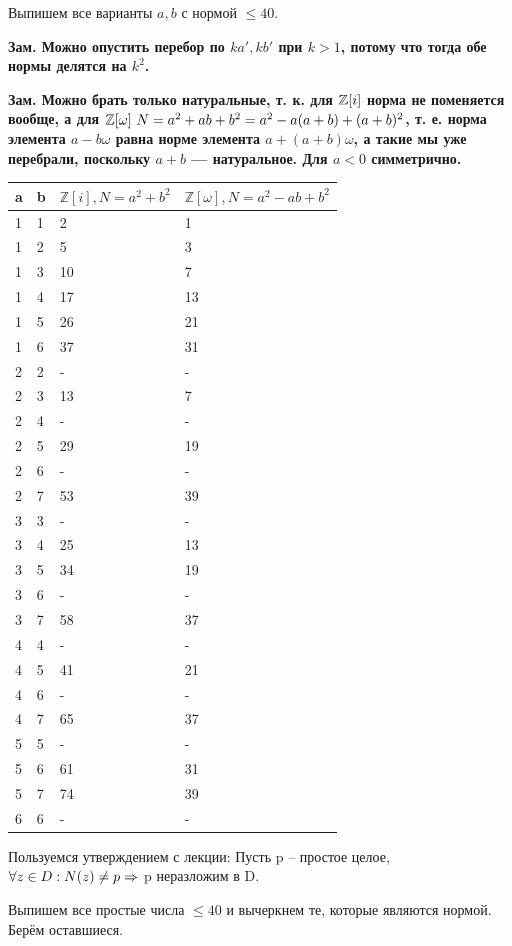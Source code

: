 \begin{solution}

Выпишем все варианты \(a, b\) с нормой \(\le 40\).

\bf{Зам.} Можно опустить перебор по \(ka', kb'\) при \(k > 1\), потому что тогда обе нормы делятся на \(k^2\).

\bf{Зам.} Можно брать только натуральные, т. к. для $\mathbb{Z}[i]$ норма не поменяется вообще, а для $\mathbb{Z}[\omega] \ N =  a^2 + ab + b^2 = a^2 - a (a+b) + (a+b)^2$, т. е. норма элемента $a - b \omega$ равна норме элемента $a + (a+b) \omega$, а такие мы уже перебрали, поскольку $a+b$ --- натуральное. Для $a <0$ симметрично.

\begin{longtable}[]{@{}llll@{}}
\toprule
a & b & \(\mathbb{Z}[i], N = a^2+b^2\) & \(\mathbb{Z}[\omega], N = a^2-ab+b^2\)\tabularnewline
\midrule
\endhead
1 & 1 & 2 & 1\tabularnewline
1 & 2 & 5 & 3\tabularnewline
1 & 3 & 10 & 7\tabularnewline
1 & 4 & 17 & 13\tabularnewline
1 & 5 & 26 & 21\tabularnewline
1 & 6 & 37 & 31\tabularnewline
2 & 2 & - & -\tabularnewline
2 & 3 & 13 & 7\tabularnewline
2 & 4 & - & -\tabularnewline
2 & 5 & 29 & 19\tabularnewline
2 & 6 & - & -\tabularnewline
2 & 7 & 53 & 39\tabularnewline
3 & 3 & - & -\tabularnewline
3 & 4 & 25 & 13\tabularnewline
3 & 5 & 34 & 19\tabularnewline
3 & 6 & - & -\tabularnewline
3 & 7 & 58 & 37\tabularnewline
4 & 4 & - & -\tabularnewline
4 & 5 & 41 & 21\tabularnewline
4 & 6 & - & -\tabularnewline
4 & 7 & 65 & 37\tabularnewline
5 & 5 & - & -\tabularnewline
5 & 6 & 61 & 31\tabularnewline
5 & 7 & 74 & 39\tabularnewline
6 & 6 & - & -\tabularnewline
\bottomrule
\end{longtable}

Пользуемся утверждением с лекции: Пусть p -- простое целое, \(\forall z \in D: N(z)\ne p \Rightarrow\) p неразложим в D.

Выпишем все простые числа \(\le 40\) и вычеркнем те, которые являются нормой. Берём оставшиеся.


\end{solution}
